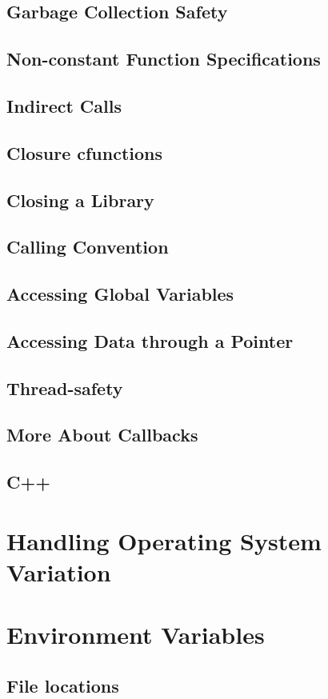     \section{Garbage Collection Safety}
    \section{Non-constant Function Specifications}
    \section{Indirect Calls}
    \section{Closure cfunctions}
    \section{Closing a Library}
    \section{Calling Convention}
    \section{Accessing Global Variables}
    \section{Accessing Data through a Pointer}
    \section{Thread-safety}
    \section{More About Callbacks}
    \section{C++}
  \chapter{Handling Operating System Variation}
  \chapter{Environment Variables}
    \section{File locations}
